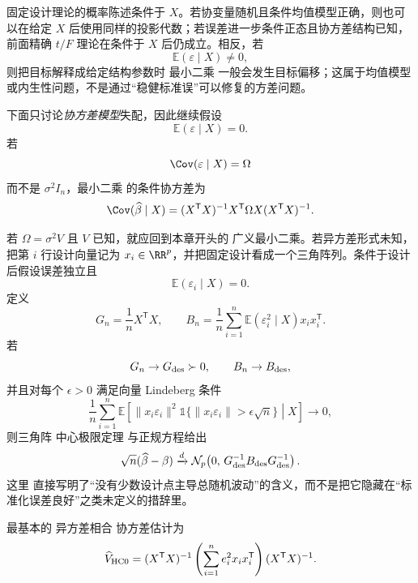 \begin{note}[条件精确推断与均值失配]
固定设计理论的概率陈述条件于 $X$。若协变量随机且条件均值模型正确，则也可以在给定 $X$ 后使用同样的投影代数；若误差进一步条件正态且协方差结构已知，前面精确 $t/F$ 理论在条件于 $X$ 后仍成立。相反，若
\[
 \mathbb E(\varepsilon\mid X)\ne0,
\]
则把目标解释成给定结构参数时 最小二乘 一般会发生目标偏移；这属于均值模型或内生性问题，不是通过“稳健标准误”可以修复的方差问题。
\end{note}

\begin{proposition}
下面只讨论\emph{协方差模型}失配，因此继续假设
\[
 \mathbb E(\varepsilon\mid X)=0.
\]
若
\[
 \Cov(\varepsilon\mid X)=\Omega
\]
而不是 $\sigma^2I_n$，最小二乘 的条件协方差为
\[
 \Cov(\widehat\beta\mid X)
 =(X^{\mathsf T}X)^{-1}
 X^{\mathsf T}\Omega X
 (X^{\mathsf T}X)^{-1}.
\]
\end{proposition}

\begin{theorem}
若 $\Omega=\sigma^2V$ 且 $V$ 已知，就应回到本章开头的 广义最小二乘。若异方差形式未知，把第 $i$ 行设计向量记为 $x_i\in\RR^p$，并把固定设计看成一个三角阵列。条件于设计后假设误差独立且
\[
 \mathbb E(\varepsilon_i\mid X)=0.
\]
定义
\[
 G_n=\frac1nX^{\mathsf T}X,
 \qquad
 B_n=\frac1n\sum_{i=1}^n
 \mathbb E(\varepsilon_i^2\mid X)x_ix_i^{\mathsf T}.
\]
若
\[
 G_n\to G_{\rm des}\succ0,
 \qquad
 B_n\to B_{\rm des},
\]
并且对每个 $\epsilon>0$ 满足向量 Lindeberg 条件
\begin{equation}\label{eq:math-stat-fixed-design-lindeberg}
 \frac1n\sum_{i=1}^n
 \mathbb E\!\left[
 \|x_i\varepsilon_i\|^2
 \mathds{1}\{\|x_i\varepsilon_i\|>\epsilon\sqrt n\}
 \middle|X
 \right]
 \longrightarrow0,
\end{equation}
则三角阵 中心极限定理 与正规方程给出
\[
 \sqrt n(\widehat\beta-\beta)
 \xrightarrow{d}
 \mathcal N_p\!\left(
 0,\,
 G_{\rm des}^{-1}B_{\rm des}G_{\rm des}^{-1}
 \right).
\]
这里  直接写明了“没有少数设计点主导总随机波动”的含义，而不是把它隐藏在“标准化误差良好”之类未定义的措辞里。
\end{theorem}

\begin{definition}[HC0 协方差估计]
最基本的 异方差相合 协方差估计为
\begin{equation*}\widehat V_{\rm HC0}
 =(X^{\mathsf T}X)^{-1}
 \left(\sum_{i=1}^ne_i^2x_ix_i^{\mathsf T}\right)
 (X^{\mathsf T}X)^{-1}.
\end{equation*}
\end{definition}

